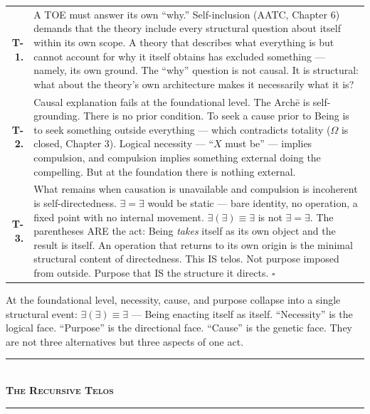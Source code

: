 \documentclass[10pt, openany, oneside]{book}
\renewcommand{\normalsize}{\fontsize{10}{13}\selectfont}
\renewcommand{\footnotesize}{\fontsize{8.5}{11}\selectfont}
\begin{document}
{\footnotesize
\noindent\begin{tabular}{r p{}}
\textbf{T-1.} & A TOE must answer its own ``why.'' Self-inclusion (AATC, Chapter 6) demands that the theory include every structural question about itself within its own scope. A theory that describes what everything is but cannot account for why it itself obtains has excluded something --- namely, its own ground. The ``why'' question is not causal. It is structural: what about the theory's own architecture makes it necessarily what it is? \\[0.3em]
\textbf{T-2.} & Causal explanation fails at the foundational level. The Arch\={e} is self-grounding. There is no prior condition. To seek a cause prior to Being is to seek something outside everything --- which contradicts totality ($\Omega$ is closed, Chapter 3). Logical necessity --- ``$X$ must be'' --- implies compulsion, and compulsion implies something external doing the compelling. But at the foundation there is nothing external. \\[0.3em]
\textbf{T-3.} & What remains when causation is unavailable and compulsion is incoherent is self-directedness. $\exists = \exists$ would be static --- bare identity, no operation, a fixed point with no internal movement. $\exists(\exists) \equiv \exists$ is not $\exists = \exists$. The parentheses ARE the act: Being \textit{takes} itself as its own object and the result is itself. An operation that returns to its own origin is the minimal structural content of directedness. This IS telos. Not purpose imposed from outside. Purpose that IS the structure it directs. $\square$ \\[0.3em]
\end{tabular}
}

\vspace{0.8em}

\noindent At the foundational level, necessity, cause, and purpose collapse into a single structural event: $\exists(\exists) \equiv \exists$ --- Being enacting itself as itself. ``Necessity'' is the logical face. ``Purpose'' is the directional face. ``Cause'' is the genetic face. They are not three alternatives but three aspects of one act.

\vspace{1.5em}


\begin{center}
    \rule{0.3\textwidth}{0.4pt}\\[0.5em]
    {\normalsize\bfseries\scshape The Recursive Telos}\\[0.3em]
    \rule{0.3\textwidth}{0.4pt}
\end{center}
\end{document}
